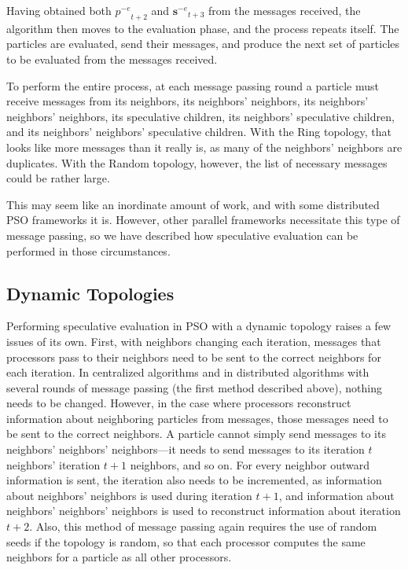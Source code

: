 \documentclass[journal,letterpaper]{IEEEtran}
\providecommand{\noeval}[1]{\ensuremath{#1^{-e}}}
\providecommand{\p}{\ensuremath{p}}
\providecommand{\sset}{\ensuremath{\mathbf{s}}}
\begin{document}
Having obtained both $\noeval{\p}_{t+2}$ and $\noeval{\sset}_{t+3}$ from the
messages received, the algorithm then moves to the evaluation phase, and the
process repeats itself.  The particles are evaluated, send their messages, and
produce the next set of particles to be evaluated from the messages received.

To perform the entire process, at each message passing round a particle must
receive messages from its neighbors, its neighbors' neighbors, its neighbors'
neighbors' neighbors, its speculative children, its neighbors' speculative
children, and its neighbors' neighbors' speculative children.  With the Ring
topology, that looks like more messages than it really is, as many of the
neighbors' neighbors are duplicates.  With the Random topology, however, the
list of necessary messages could be rather large.  

This may seem like an inordinate amount of work, and with some distributed PSO
frameworks it is.  However, other parallel frameworks necessitate this type of
message passing, so we have described how speculative evaluation can be
performed in those circumstances.

\subsection{Dynamic Topologies}

Performing speculative evaluation in PSO with a dynamic topology raises a few
issues of its own.  First, with neighbors changing each iteration, messages
that processors pass to their neighbors need to be sent to the correct
neighbors for each iteration.  In centralized algorithms and in distributed
algorithms with several rounds of message passing (the first method described
above), nothing needs to be changed.  However, in the case where processors
reconstruct information about neighboring particles from messages, those
messages need to be sent to the correct neighbors.  A particle cannot simply
send messages to its neighbors' neighbors' neighbors---it needs to send
messages to its iteration $t$ neighbors' iteration $t+1$ neighbors, and so on.
For every neighbor outward information is sent, the iteration also needs to be
incremented, as information about neighbors' neighbors is used during iteration
$t+1$, and information about neighbors' neighbors' neighbors is used to
reconstruct information about iteration $t+2$.  Also, this method of message
passing again requires the use of random seeds if the topology is random, so
that each processor computes the same neighbors for a particle as all other
processors.
\end{document}
